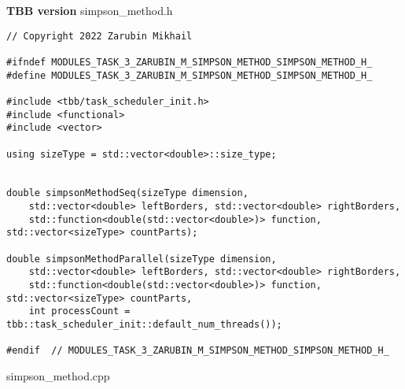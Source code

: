 \documentclass{report}
\begin{document}
\textbf{TBB version}
\newline
\newline simpson\_method.h
\begin{lstlisting}
// Copyright 2022 Zarubin Mikhail

#ifndef MODULES_TASK_3_ZARUBIN_M_SIMPSON_METHOD_SIMPSON_METHOD_H_
#define MODULES_TASK_3_ZARUBIN_M_SIMPSON_METHOD_SIMPSON_METHOD_H_

#include <tbb/task_scheduler_init.h>
#include <functional>
#include <vector>

using sizeType = std::vector<double>::size_type;


double simpsonMethodSeq(sizeType dimension,
    std::vector<double> leftBorders, std::vector<double> rightBorders,
    std::function<double(std::vector<double>)> function, std::vector<sizeType> countParts);

double simpsonMethodParallel(sizeType dimension,
    std::vector<double> leftBorders, std::vector<double> rightBorders,
    std::function<double(std::vector<double>)> function, std::vector<sizeType> countParts,
    int processCount = tbb::task_scheduler_init::default_num_threads());

#endif  // MODULES_TASK_3_ZARUBIN_M_SIMPSON_METHOD_SIMPSON_METHOD_H_

\end{lstlisting}
simpson\_method.cpp
\end{document}
